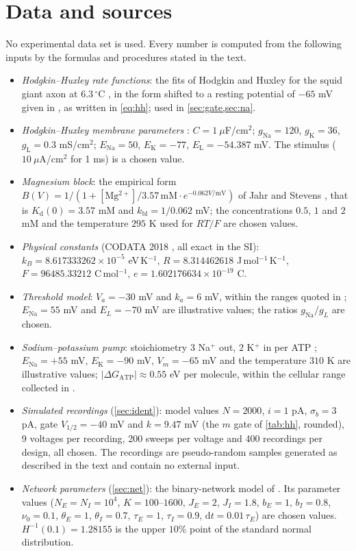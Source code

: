 \documentclass[11pt]{article}
\theoremstyle{definition}\newtheorem{definition}[theorem]{Definition}
\theoremstyle{remark}\newtheorem{remark}[theorem]{Remark}
\begin{document}
\section{Data and sources}\label{sec:data}
No experimental data set is used. Every number is computed from the following inputs by the formulas and procedures stated in the text.
\begin{itemize}
\item \emph{Hodgkin--Huxley rate functions}: the fits of Hodgkin and Huxley for the squid giant axon at $6.3\,^\circ$C \cite{HH}, in the form shifted to a resting potential of $-65$ mV given in \cite[Ch.~5]{DayanAbbott}, as written in \eqref{eq:hh}; used in \cref{sec:gate,sec:na}.
\item \emph{Hodgkin--Huxley membrane parameters} \cite{HH,DayanAbbott}: $C=1\ \mu$F/cm$^2$; $g_{\mathrm{Na}}=120$, $g_{\mathrm{K}}=36$, $g_{\mathrm{L}}=0.3$ mS/cm$^2$; $E_{\mathrm{Na}}=50$, $E_{\mathrm{K}}=-77$, $E_{\mathrm{L}}=-54.387$ mV. The stimulus ($10\ \mu$A/cm$^2$ for 1 ms) is a chosen value.
\item \emph{Magnesium block}: the empirical form $B(V)=1/(1+[\mathrm{Mg^{2+}}]/3.57\,\mathrm{mM}\cdot e^{-0.062V/\mathrm{mV}})$ of Jahr and Stevens \cite{JahrStevens}, that is $K_{\mathrm d}(0)=3.57$ mM and $k_{\mathrm{bl}}=1/0.062$ mV; the concentrations $0.5$, $1$ and $2$ mM and the temperature $295$ K used for $RT/F$ are chosen values.
\item \emph{Physical constants} (CODATA 2018 \cite{CODATA}, all exact in the SI): $k_B=8.617333262\times10^{-5}$ eV\,K$^{-1}$, $R=8.314462618$ J\,mol$^{-1}$\,K$^{-1}$, $F=96485.33212$ C\,mol$^{-1}$, $e=1.602176634\times10^{-19}$ C.
\item \emph{Threshold model}: $V_a=-30$ mV and $k_a=6$ mV, within the ranges quoted in \cite{PB}; $E_\mathrm{Na}=55$ mV and $E_L=-70$ mV are illustrative values; the ratios $g_\mathrm{Na}/g_L$ are chosen.
\item \emph{Sodium--potassium pump}: stoichiometry $3$ Na$^+$ out, $2$ K$^+$ in per ATP \cite{Nguyen}; $E_\mathrm{Na}=+55$ mV, $E_\mathrm K=-90$ mV, $V_m=-65$ mV and the temperature $310$ K are illustrative values; $|\Delta G_\mathrm{ATP}|\approx0.55$ eV per molecule, within the cellular range collected in \cite{MiloPhillips}.
\item \emph{Simulated recordings} (\cref{sec:ident}): model values $N=2000$, $i=1$ pA, $\sigma_b=3$ pA, gate $V_{1/2}=-40$ mV and $k=9.47$ mV (the $m$ gate of \cref{tab:hh}, rounded), 9 voltages per recording, 200 sweeps per voltage and 400 recordings per design, all chosen. The recordings are pseudo-random samples generated as described in the text and contain no external input.
\item \emph{Network parameters} (\cref{sec:net}): the binary-network model of \cite{vVS96,vVS98}. Its parameter values ($N_E=N_I=10^4$, $K=100$--$1600$, $J_E=2$, $J_I=1.8$, $b_E=1$, $b_I=0.8$, $\nu_0=0.1$, $\theta_E=1$, $\theta_I=0.7$, $\tau_E=1$, $\tau_I=0.9$, $\mathrm dt=0.01\,\tau_E$) are chosen values. $H^{-1}(0.1)=1.28155$ is the upper $10\%$ point of the standard normal distribution.
\end{itemize}
\end{document}
